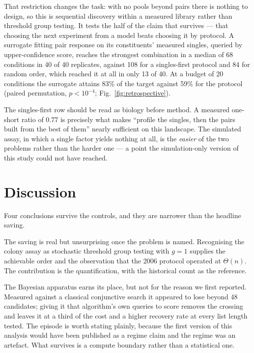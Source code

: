 \documentclass[10pt]{article}
\begin{document}
That restriction changes the task: with no pools beyond pairs there is nothing
to design, so this is sequential discovery within a measured library rather
than threshold group testing. It tests the half of the claim that survives ---
that choosing the next experiment from a model beats choosing it by protocol.
A surrogate fitting pair response on its constituents' measured singles,
queried by upper-confidence score, reaches the strongest combination in a
median of 68 conditions in 40 of 40 replicates, against 108 for a
singles-first protocol and 84 for random order, which reached it at all in
only 13 of 40. At a budget of 20 conditions the surrogate attains 83\% of the
target against 59\% for the protocol (paired permutation, $p<10^{-4}$;
Fig.~\ref{fig:retrospective}).

The singles-first row should be read as biology before method. A measured
one-short ratio of 0.77 is precisely what makes ``profile the singles, then
the pairs built from the best of them'' nearly sufficient on this landscape.
The simulated assay, in which a single factor yields nothing at all, is the
\emph{easier} of the two problems rather than the harder one --- a point the
simulation-only version of this study could not have reached.

\section{Discussion}

Four conclusions survive the controls, and they are narrower than the headline
saving.

The saving is real but unsurprising once the problem is named. Recognising the
colony assay as stochastic threshold group testing with $g=1$ supplies the
achievable order and the observation that the 2006 protocol operated at
$\Theta(n)$. The contribution is the quantification, with the historical count
as the reference.

The Bayesian apparatus earns its place, but not for the reason we first
reported. Measured against a classical conjunctive search it appeared to lose
beyond 48 candidates; giving it that algorithm's own queries to score removes
the crossing and leaves it at a third of the cost and a higher recovery rate at
every list length tested. The episode is worth stating plainly, because the
first version of this analysis would have been published as a regime claim and
the regime was an artefact. What survives is a compute boundary rather than a
statistical one.
\end{document}
